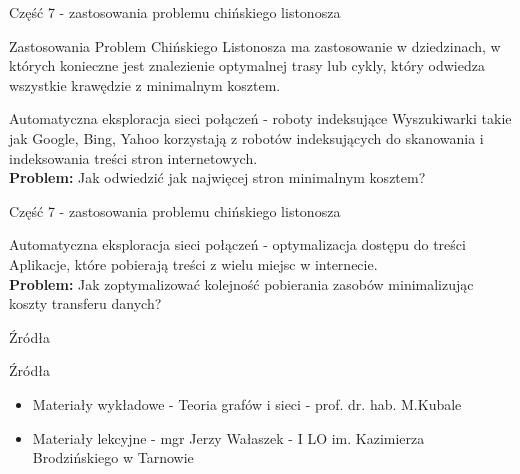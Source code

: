 \documentclass[polish,envcountsect,10pt]{beamer}
\begin{document}
\begin{frame}{Część 7 - zastosowania problemu chińskiego listonosza}
    \begin{block}{Zastosowania}
        Problem Chińskiego Listonosza ma zastosowanie w dziedzinach, w których konieczne jest znalezienie
        optymalnej trasy lub cykly, który odwiedza wszystkie krawędzie z minimalnym kosztem.
    \end{block}
    \begin{block}{Automatyczna eksploracja sieci połączeń - roboty indeksujące}
        Wyszukiwarki takie jak Google, Bing, Yahoo korzystają z robotów indeksujących do skanowania i indeksowania
        treści stron internetowych. \\\textbf{Problem:} Jak odwiedzić jak najwięcej stron minimalnym kosztem?
    \end{block}
\end{frame}

\begin{frame}{Część 7 - zastosowania problemu chińskiego listonosza}
    \begin{block}{Automatyczna eksploracja sieci połączeń - optymalizacja dostępu do treści}
        Aplikacje, które pobierają treści z wielu miejsc w internecie. \\\textbf{Problem:} Jak zoptymalizować kolejność pobierania zasobów minimalizując koszty transferu danych?
    \end{block}
\end{frame}

\begin{frame}{Źródła}
    \begin{block}{Źródła}
        \begin{itemize}
            \item Materiały wykładowe - Teoria grafów i sieci - prof. dr. hab. M.Kubale
            \item Materiały lekcyjne - mgr Jerzy Wałaszek - I LO im. Kazimierza Brodzińskiego w Tarnowie
        \end{itemize}
    \end{block}
\end{frame}
\end{document}
